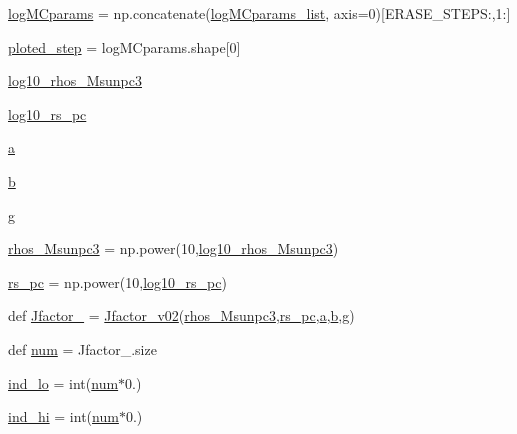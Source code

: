 \begin{DoxyCompactItemize}
\item 
\hyperlink{namespacejfactor_a1c0eda6de5a29ea1a33584eb69690477}{log\+M\+Cparams} = np.\+concatenate(\hyperlink{namespacejfactor_a025ed272933b6b6f31f688649810e704}{log\+M\+Cparams\+\_\+list}, axis=0)\mbox{[}E\+R\+A\+S\+E\+\_\+\+S\+T\+E\+P\+S\+:,1\+:\mbox{]}
\item 
\hyperlink{namespacejfactor_a979d9034e576ba9891d6a8eb13f2a8b9}{ploted\+\_\+step} = log\+M\+Cparams.\+shape\mbox{[}0\mbox{]}
\item 
\hyperlink{namespacejfactor_af2c2b0ba5a6685424721abec6152e28d}{log10\+\_\+rhos\+\_\+\+Msunpc3}
\item 
\hyperlink{namespacejfactor_a3102b0936ba8da6d8f0bf7044cd1aa7c}{log10\+\_\+rs\+\_\+pc}
\item 
\hyperlink{namespacejfactor_ab5ce4a1ef962b5f938f157d0abc69a20}{a}
\item 
\hyperlink{namespacejfactor_a52f3e9e591dbe4f5d14f760a578cb15b}{b}
\item 
\hyperlink{namespacejfactor_a1e07b351e264fceb00b01b4a591e45e5}{g}
\item 
\hyperlink{namespacejfactor_aa9f6835eba853a5bb2b380ad7fb87010}{rhos\+\_\+\+Msunpc3} = np.\+power(10,\hyperlink{namespacejfactor_af2c2b0ba5a6685424721abec6152e28d}{log10\+\_\+rhos\+\_\+\+Msunpc3})
\item 
\hyperlink{namespacejfactor_ae602db7ab45f472ad4007d04def859f7}{rs\+\_\+pc} = np.\+power(10,\hyperlink{namespacejfactor_a3102b0936ba8da6d8f0bf7044cd1aa7c}{log10\+\_\+rs\+\_\+pc})
\item 
def \hyperlink{namespacejfactor_adfab35ee4763d30c17fe3a8791394e44}{Jfactor\+\_\+} = \hyperlink{namespacejfactor_abfd9403bf30810505dc44d7af9746a12}{Jfactor\+\_\+v02}(\hyperlink{namespacejfactor_aa9f6835eba853a5bb2b380ad7fb87010}{rhos\+\_\+\+Msunpc3},\hyperlink{namespacejfactor_ae602db7ab45f472ad4007d04def859f7}{rs\+\_\+pc},\hyperlink{namespacejfactor_ab5ce4a1ef962b5f938f157d0abc69a20}{a},\hyperlink{namespacejfactor_a52f3e9e591dbe4f5d14f760a578cb15b}{b},\hyperlink{namespacejfactor_a1e07b351e264fceb00b01b4a591e45e5}{g})
\item 
def \hyperlink{namespacejfactor_a4345d50706cf418a1957595314a7af18}{num} = Jfactor\+\_\+.\+size
\item 
\hyperlink{namespacejfactor_aaf9c1c756ff45c03f48ccc922857360f}{ind\+\_\+lo} = int(\hyperlink{namespacejfactor_a4345d50706cf418a1957595314a7af18}{num}$\ast$0.)
\item 
\hyperlink{namespacejfactor_a449b6d5eec9600e32c2388268c367957}{ind\+\_\+hi} = int(\hyperlink{namespacejfactor_a4345d50706cf418a1957595314a7af18}{num}$\ast$0.)

\end{DoxyCompactItemize}
